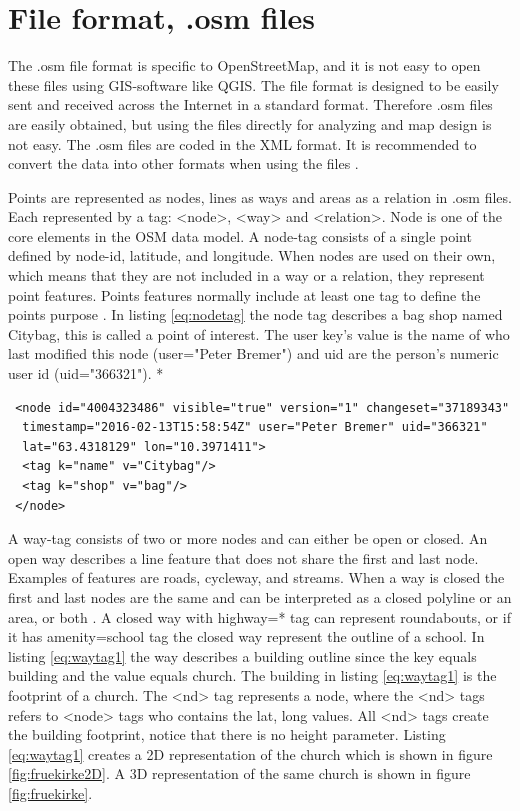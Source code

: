 \section{File format, .osm files}
The .osm file format is specific to OpenStreetMap, and it is not easy to open these files using GIS-software like QGIS. The file format is designed to be easily sent and received across the Internet in a standard format. Therefore .osm files are easily obtained, but using the files directly for analyzing and map design is not easy. The .osm files are coded in the XML format. It is recommended to convert the data into other formats when using the files \cite{Learnosm}. 

Points are represented as nodes, lines as ways and areas as a relation in .osm files. Each represented by a tag: <node>, <way> and <relation>. Node is one of the core elements in the OSM data model. A node-tag consists of a single point defined by node-id, latitude, and longitude. When nodes are used on their own, which means that they are not included in a way or a relation, they represent point features. Points features normally include at least one tag to define the points purpose \cite{OpenStreetMapc}. In listing \ref{eq:nodetag} the node tag describes a bag shop named Citybag, this is called a point of interest. The user key's value is the name of who last modified this node (user="Peter Bremer") and uid are the person's numeric user id (uid="366321"). * %

\begin{lstlisting}
 <node id="4004323486" visible="true" version="1" changeset="37189343"
  timestamp="2016-02-13T15:58:54Z" user="Peter Bremer" uid="366321" 
  lat="63.4318129" lon="10.3971411">
  <tag k="name" v="Citybag"/>
  <tag k="shop" v="bag"/>
 </node>
\end{lstlisting}

A way-tag consists of two or more nodes and can either be open or closed. An open way describes a line feature that does not share the first and last node. Examples of features are roads, cycleway, and streams. When a way is closed the first and last nodes are the same and can be interpreted as a closed polyline or an area, or both \cite{OpenStreetMapd}. A closed way with highway=* tag can represent roundabouts, or if it has amenity=school tag the closed way represent the outline of a school. In listing \ref{eq:waytag1} the way describes a building outline since the key equals building and the value equals church.  The building in listing \ref{eq:waytag1} is the footprint of a church. The <nd> tag represents a node, where the <nd> tags refers to <node> tags who contains the lat, long values. All <nd> tags create the building footprint, notice that there is no height parameter. Listing \ref{eq:waytag1} creates a 2D representation of the church which is shown in figure \ref{fig:fruekirke2D}. A 3D representation of the same church is shown in figure \ref{fig:fruekirke}.

